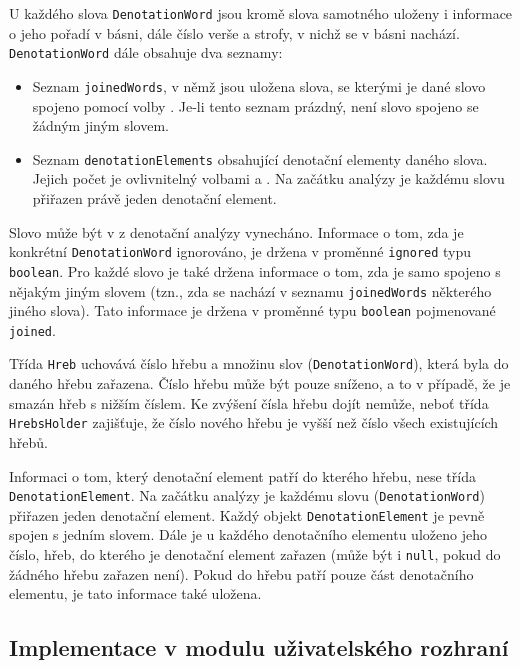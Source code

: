 \documentclass[dp.tex]{subfiles}
\begin{document}
U každého slova \texttt{DenotationWord} jsou kromě slova samotného uloženy i informace o jeho pořadí v básni, dále číslo verše a strofy, v nichž se v básni nachází. \texttt{DenotationWord} dále obsahuje dva seznamy:
\begin{itemize}
\item Seznam \texttt{joinedWords}, v němž jsou uložena slova, se kterými je dané slovo spojeno pomocí volby . Je-li tento seznam prázdný, není slovo spojeno se žádným jiným slovem.
\item Seznam \texttt{denotationElements} obsahující denotační elementy daného slova. Jejich počet je ovlivnitelný volbami  a . Na začátku analýzy je každému slovu přiřazen právě jeden denotační element.
\end{itemize}

Slovo může být v z denotační analýzy vynecháno. Informace o tom, zda je konkrétní \texttt{DenotationWord} ignorováno, je držena v proměnné \texttt{ignored} typu \texttt{boolean}. Pro každé slovo je také držena informace o tom, zda je samo spojeno s nějakým jiným slovem (tzn., zda se nachází v seznamu \texttt{joinedWords} některého jiného slova). Tato informace je držena v proměnné typu \texttt{boolean} pojmenované \texttt{joined}.

Třída \texttt{Hreb} uchovává číslo hřebu a množinu slov (\texttt{DenotationWord}), která byla do daného hřebu zařazena. Číslo hřebu může být pouze sníženo, a to v případě, že je smazán hřeb s nižším číslem. Ke zvýšení čísla hřebu dojít nemůže, neboť třída \texttt{HrebsHolder} zajišťuje, že číslo nového hřebu je vyšší než číslo všech existujících hřebů.

Informaci o tom, který denotační element patří do kterého hřebu, nese třída \texttt{DenotationElement}. Na začátku analýzy je každému slovu (\texttt{DenotationWord}) přiřazen jeden denotační element. Každý objekt \texttt{DenotationElement} je pevně spojen s jedním slovem. Dále je u každého denotačního elementu uloženo jeho číslo, hřeb, do kterého je denotační element zařazen (může být i \texttt{null}, pokud do žádného hřebu zařazen není). Pokud do hřebu patří pouze část denotačního elementu, je tato informace také uložena.

\subsection{Implementace v modulu uživatelského rozhraní}
\end{document}
